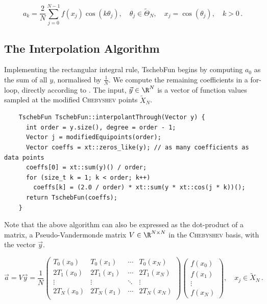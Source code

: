 \documentclass[12pt, a4paper]{article}
\newcommand{\chebyshev}{\textsc{Chebyshev}\xspace}
\newcommand{\tschebfun}{\textcolor{themecolor3}{TschebFun}\xspace}
\begin{document}
  \begin{equation}
    a_k = \frac{2}{N} \sum_{j=0}^{N-1} f(x_j) \cos(k \theta_j), \quad \theta_j \in \tilde{\Theta}_N, \quad x_j = \cos(\theta_j), \quad k > 0 \,.
    \label{eq:coefficient-formula}
  \end{equation}

  \subsection{The Interpolation Algorithm}
  Implementing the rectangular integral rule, \tschebfun begins by computing $a_0$ as the sum of all $y$, normalised by $\frac{1}{N}$.
  We compute the remaining coefficients in a for-loop, directly according to .
  The input, $\vec{y} \in \R^N$ is a vector of function values sampled at the modified \chebyshev points $\tilde{X}_N$.
  \begin{verbatim}
    TschebFun TschebFun::interpolantThrough(Vector y) {
      int order = y.size(), degree = order - 1;
      Vector j = modifiedEquipoints(order);
      Vector coeffs = xt::zeros_like(y); // as many coefficients as data points
      coeffs[0] = xt::sum(y)() / order;
      for (size_t k = 1; k < order; k++)
        coeffs[k] = (2.0 / order) * xt::sum(y * xt::cos(j * k))();
      return TschebFun(coeffs);
    }
  \end{verbatim}

  Note that the above algorithm can also be expressed as the dot-product of a matrix, a Pseudo-Vandermonde matrix $V \in \R^{N\times N}$ in the \chebyshev basis, with the vector $\vec{y}$.

  $$\vec{a} = V \vec{y} = \frac{1}{N} \begin{pmatrix}
      T_0(x_0)  & T_0(x_1)  & \cdots & T_0(x_N)  \\
      2T_1(x_0) & 2T_1(x_1) & \cdots & 2T_1(x_N) \\
      \vdots    & \vdots    & \ddots & \vdots    \\
      2T_N(x_0) & 2T_N(x_1) & \cdots & 2T_N(x_N) \\
    \end{pmatrix} \begin{pmatrix}
      f(x_0) \\
      f(x_1) \\
      \vdots \\
      f(x_N)
    \end{pmatrix}, \quad x_j \in \tilde{X}_N \,.$$

\end{document}
